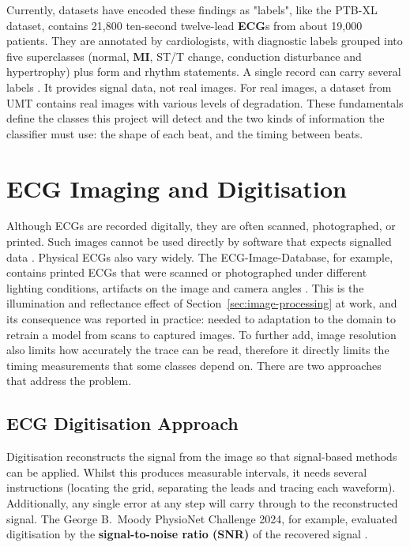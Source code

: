 Currently, datasets have encoded these findings as "labels", like the PTB-XL dataset, contains 21,800 ten-second twelve-lead \textbf{ECG}s from about 19,000 patients. They are annotated by cardiologists, with diagnostic labels grouped into five superclasses (normal, \textbf{MI}, ST/T change,
conduction disturbance and hypertrophy) plus form and rhythm statements. A single record can carry several labels \cite{wagner_ptbxl_2020}. It provides signal data, not real images. For real images, a dataset from UMT \cite{khan_ecg_2021} contains real images with various levels of degradation. These
fundamentals define the classes this project will detect and the two kinds of
information the classifier must use: the shape of each beat, and the timing between beats.

\section{ECG Imaging and Digitisation}
\label{sec:ecg-imaging}

Although ECGs are recorded digitally, they are often scanned, photographed, or printed. Such images cannot be used directly by software that expects
signalled data \cite{shivashankara_ecg-image-kit_2024}. Physical ECGs also vary widely. The
ECG-Image-Database, for example, contains printed ECGs that were scanned or photographed under different lighting conditions, artifacts on the image and camera angles \cite{reyna_ecg-image-database_2024}. This is the illumination and reflectance
effect of Section~\ref{sec:image-processing} at work, and its consequence was reported in practice: \textcite{gliner_domain_2023} needed to adaptation to the domain to retrain a model from scans to captured images. To further add, image resolution also limits how accurately the trace can be read, therefore it directly limits the timing measurements that some classes depend on. There are two approaches that address the problem.
\subsection{ECG Digitisation Approach}
\label{sec:digitisation}
 Digitisation reconstructs the  signal
from the image so that signal-based methods can be applied. Whilst this produces
measurable intervals, it needs several instructions (locating the grid, separating the leads
and tracing each waveform). Additionally, any single error at any step will carry through to the reconstructed signal. The George B.\ Moody PhysioNet Challenge 2024, for example,
evaluated digitisation by the \textbf{signal-to-noise ratio (SNR)} of the recovered
signal \cite{physionet_challenge_2024}. 

